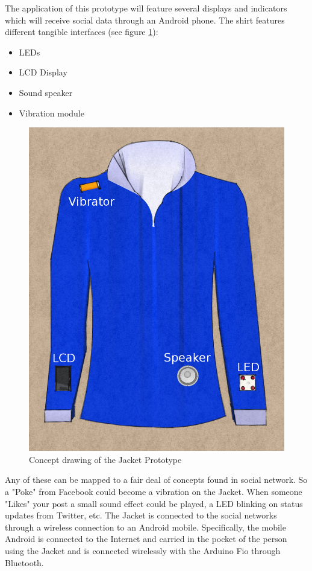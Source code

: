 The application of this prototype will feature several displays and indicators which will receive social data through an Android phone.
The shirt features different tangible interfaces (see figure \ref{fig:design-TShirt}):
	
\begin{itemize}
	\item LEDs
	\item LCD Display
	\item Sound speaker
	\item Vibration module
\end{itemize}

\begin{figure}[H]
	\begin{center}
	\includegraphics[scale=0.2]{img/design-tshirtproto}
	\end{center}
	\caption{Concept drawing of the Jacket Prototype}
	\label{fig:design-TShirt}
\end{figure}
	
Any of these can be mapped to a fair deal of concepts found in social network.
So a "Poke" from Facebook could become a vibration on the Jacket. When someone "Likes" your post a small sound effect
could be played, a LED blinking on status updates from Twitter, etc. The Jacket is connected to the social networks
through a wireless connection to an Android mobile. Specifically, the mobile Android is connected to the Internet
and carried in the pocket of the person using the Jacket and is connected wirelessly with the Arduino Fio through Bluetooth.

